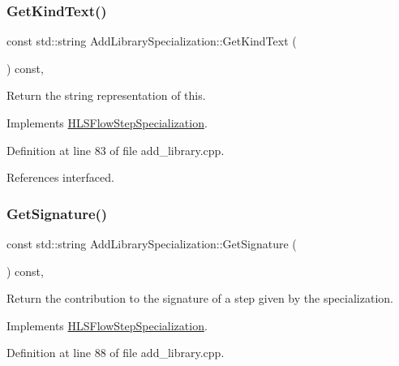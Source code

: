 \subsubsection{\texorpdfstring{Get\+Kind\+Text()}{GetKindText()}}
{\footnotesize\ttfamily const std\+::string Add\+Library\+Specialization\+::\+Get\+Kind\+Text (\begin{DoxyParamCaption}{ }\end{DoxyParamCaption}) const\hspace{0.3cm}{\ttfamily [override]}, {\ttfamily [virtual]}}



Return the string representation of this. 



Implements \hyperlink{classHLSFlowStepSpecialization_abcad0108fa726ac69986e26671a75ec3}{H\+L\+S\+Flow\+Step\+Specialization}.



Definition at line 83 of file add\+\_\+library.\+cpp.



References interfaced.

\mbox{\label{classAddLibrarySpecialization_ab2e29e010e6b3e2a708539770e5de646}} 
\subsubsection{\texorpdfstring{Get\+Signature()}{GetSignature()}}
{\footnotesize\ttfamily const std\+::string Add\+Library\+Specialization\+::\+Get\+Signature (\begin{DoxyParamCaption}{ }\end{DoxyParamCaption}) const\hspace{0.3cm}{\ttfamily [override]}, {\ttfamily [virtual]}}



Return the contribution to the signature of a step given by the specialization. 



Implements \hyperlink{classHLSFlowStepSpecialization_ae8c6ce8a3495c93e8a8edc01d8727023}{H\+L\+S\+Flow\+Step\+Specialization}.



Definition at line 88 of file add\+\_\+library.\+cpp.



